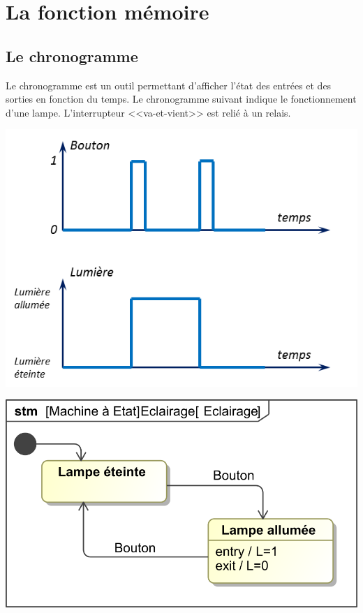 \documentclass[10pt,fleqn]{article} %
\begin{document}

\setlength{\columnseprule}{.1pt}

\vspace{2cm}
\pagestyle{fancy}
\thispagestyle{plain}


\section{La fonction mémoire}

\subsection{Le chronogramme}
Le chronogramme est un outil permettant d'afficher l'état des entrées et des sorties en fonction du temps. Le chronogramme suivant indique le fonctionnement d'une lampe. L'interrupteur <<va-et-vient>> est relié à un relais. 

\begin{minipage}[c]{.47\linewidth}
\begin{center}
\includegraphics[width=.9\textwidth]{images/Chrono1}
\end{center}
\end{minipage} \hfill
\begin{minipage}[c]{.47\linewidth}
\begin{center}
\includegraphics[width=.95\textwidth]{images/Eclairage}
\end{center}
\end{minipage}
\end{document}
